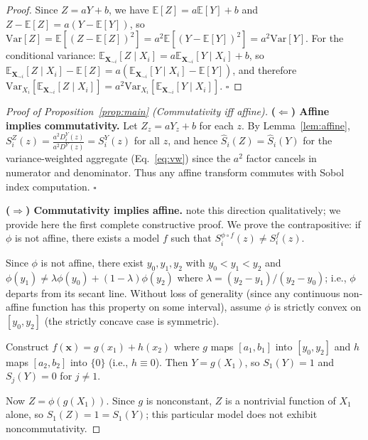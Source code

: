 \documentclass[11pt,onecolumn]{article}
\begin{document}
\begin{proof}
Since $Z = aY + b$, we have $\mathbb{E}[Z] = a\mathbb{E}[Y] + b$ and
$Z - \mathbb{E}[Z] = a(Y - \mathbb{E}[Y])$, so
$\mathrm{Var}[Z] = \mathbb{E}[(Z-\mathbb{E}[Z])^2] = a^2 \mathbb{E}[(Y-\mathbb{E}[Y])^2] = a^2\mathrm{Var}[Y]$.
For the conditional variance:
$\mathbb{E}_{\mathbf{X}_{\sim i}}[Z \mid X_i] = a\mathbb{E}_{\mathbf{X}_{\sim i}}[Y \mid X_i] + b$,
so
$\mathbb{E}_{\mathbf{X}_{\sim i}}[Z \mid X_i] - \mathbb{E}[Z]
= a(\mathbb{E}_{\mathbf{X}_{\sim i}}[Y \mid X_i] - \mathbb{E}[Y])$,
and therefore
$\mathrm{Var}_{X_i}[\mathbb{E}_{\mathbf{X}_{\sim i}}[Z \mid X_i]]
= a^2 \mathrm{Var}_{X_i}[\mathbb{E}_{\mathbf{X}_{\sim i}}[Y \mid X_i]]$. \qquad $\square$
\end{proof}

\begin{proof}[Proof of Proposition~\ref{prop:main} (Commutativity iff affine)]

\textbf{($\Leftarrow$) Affine implies commutativity.}
Let $Z_z = aY_z + b$ for each $z$.  By Lemma~\ref{lem:affine},
$S_i^Z(z) = \frac{a^2 D_i^Y(z)}{a^2 D^Y(z)} = S_i^Y(z)$ for all $z$,
and hence $\hat{S}_i(Z) = \hat{S}_i(Y)$ for the variance-weighted aggregate
(Eq.~\ref{eq:vw}) since the $a^2$ factor cancels in numerator and denominator.
Thus any affine transform commutes with Sobol index computation. $\square$

\textbf{($\Rightarrow$) Commutativity implies affine.}
\citet{Borgonovo2014} note this direction qualitatively; we provide here the
first complete constructive proof.
We prove the contrapositive: if $\phi$ is not affine, there exists a model $f$
such that $S_i^{\phi \circ f}(z) \neq S_i^f(z)$.

Since $\phi$ is not affine, there exist $y_0, y_1, y_2$ with $y_0 < y_1 < y_2$
and $\phi(y_1) \neq \lambda \phi(y_0) + (1-\lambda)\phi(y_2)$ where
$\lambda = (y_2 - y_1)/(y_2 - y_0)$; i.e., $\phi$ departs from its secant line.
Without loss of generality (since any continuous non-affine function has this
property on some interval), assume $\phi$ is strictly convex on $[y_0, y_2]$
(the strictly concave case is symmetric).

Construct $f(\mathbf{x}) = g(x_1) + h(x_2)$ where $g$ maps $[a_1,b_1]$ into
$[y_0, y_2]$ and $h$ maps $[a_2, b_2]$ into $\{0\}$ (i.e., $h \equiv 0$).
Then $Y = g(X_1)$, so $S_1(Y) = 1$ and $S_j(Y) = 0$ for $j \neq 1$.

Now $Z = \phi(g(X_1))$.  Since $g$ is nonconstant, $Z$ is a nontrivial
function of $X_1$ alone, so $S_1(Z) = 1 = S_1(Y)$; this particular model
does not exhibit noncommutativity.


\end{proof}
\end{document}
